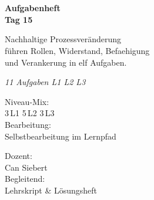 \documentclass[11pt,a4paper,oneside]{article}
\newcommand{\caveatfontfallback}{\itshape}
\newcommand\caveatfont{\caveatfontfallback}%
\begin{document}
\begin{titlepage}
  \pagestyle{empty}
  \vspace*{1.5cm}
  \\[2pt]
  \noindent{\color{lpAccent}\rule{\linewidth}{1.2pt}}\\[4pt]

  \vspace{3cm}
  {\sffamily\fontsize{30}{34}\selectfont\bfseries\color{lpInk}Aufgabenheft\\Tag 15\par}

  \vspace{0.7cm}
  {\sffamily\large\color{lpGray}Nachhaltige Prozess\-ver\"anderung\\f\"uhren \textendash{} Rollen, Widerstand, Befaehigung\\und Verankerung in elf Aufgaben.\par}

  \vspace{1.5cm}
  {\caveatfont\LARGE\color{lpAmber}11 Aufgaben \textperiodcentered{} L1 \textperiodcentered{} L2 \textperiodcentered{} L3}\par

  \vfill

  \noindent\begin{minipage}{0.55\linewidth}
    {\sffamily\footnotesize\color{lpGray}Niveau-Mix:}\\
    {\sffamily\small\color{lpInk}3\,\textsf{L1} \textperiodcentered{} 5\,\textsf{L2} \textperiodcentered{} 3\,\textsf{L3}}\\[10pt]
    {\sffamily\footnotesize\color{lpGray}Bearbeitung:}\\
    {\sffamily\small\color{lpInk}Selbstbearbeitung im Lernpfad}
  \end{minipage}\hfill
  \begin{minipage}{0.4\linewidth}
    \raggedleft
    {\sffamily\footnotesize\color{lpGray}Dozent:}\\
    {\sffamily\small\color{lpInk}Can Siebert}\\[10pt]
    {\sffamily\footnotesize\color{lpGray}Begleitend:}\\
    {\sffamily\small\color{lpInk}Lehrskript \& L\"osungsheft}
  \end{minipage}

  \vspace{0.5cm}
  \noindent{\color{lpAccent}\rule{\linewidth}{0.6pt}}
\end{titlepage}
\end{document}
